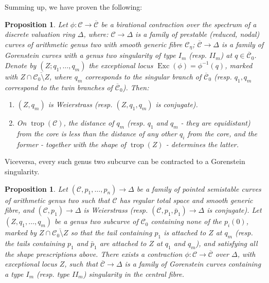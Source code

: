 \documentclass{compositio}
\renewcommand{\to}{\rightarrow}
\newcommand{\dvr}{\Delta}
\newcommand{\Exc}{\operatorname{Exc}}
\theoremstyle{plain}
\newtheorem{prop}[thm]{Proposition}
\theoremstyle{definition}
\theoremstyle{remark}
\begin{document}
 Summing up, we have proven the following:

\begin{prop}\label{prop:tailI}
 Let $\phi\colon\mathcal C\to\overline{\mathcal C}$ be a birational contraction over the spectrum of a discrete valuation ring $\dvr$, where: $\mathcal C\to \dvr$ is a family of prestable (reduced, nodal) curves of arithmetic genus two with smooth generic fibre $\mathcal C_{\eta}$; $\overline{\mathcal C}\to\dvr$ is a family of Gorenstein curves with a genus two singularity of type $I_m$ (resp. $I\!I_m$) at $q\in\overline{\mathcal C}_0$. Denote by $(Z;q_1,\ldots,q_m)$ the exceptional locus $\Exc(\phi)=\phi^{-1}(q)$, marked with $Z\cap\overline{\mathcal C_0\setminus Z}$, where $q_m$ corresponds to the singular branch of $\overline{\mathcal C}_0$ (resp. $q_1,q_m$ correspond to the twin branches of $\overline{\mathcal C}_0$). Then:
 \begin{enumerate}[leftmargin=.6cm]
  \item $(Z,q_m)$ is Weierstrass (resp. $(Z,q_1,q_m)$ is conjugate).
  \item On $\operatorname{trop}(\mathcal C)$, the distance of $q_m$ (resp. $q_1$ and $q_m$ - they are equidistant) from the core is less than the distance of any other $q_i$ from the core, and the former - together with the shape of $\operatorname{trop}(Z)$ - determines the latter.
 \end{enumerate}
\end{prop}

Viceversa, every such genus two subcurve can be contracted to a Gorenstein singularity.

\begin{prop}\label{prop:contractionI}
 Let $(\mathcal C,p_1,\ldots,p_n)\to\dvr$ be a family of pointed semistable curves of arithmetic genus two such that $\mathcal C$ has regular total space and smooth generic fibre, and $(\mathcal C,p_1)\to \Delta$ is Weierstrass (resp. $(\mathcal C,p_1,\bar p_1)\to \Delta$ is conjugate). Let $(Z,q_1,\ldots,q_m)$ be a genus two subcurve of $\mathcal C_0$ containing none of the $p_i(0)$, marked by $Z\cap \overline{\mathcal C_0\setminus Z}$ so that the tail containing $p_1$ is attached to $Z$ at $q_m$ (resp. the tails containing $p_1$ and $\bar p_1$ are attached to $Z$ at $q_1$ and $q_m$), and satisfying all the shape prescriptions above. There exists a contraction $\phi\colon\mathcal C\to\overline{\mathcal C}$ over $\dvr$, with exceptional locus $Z$, such that $\overline{\mathcal C}\to\dvr$ is a family of Gorenstein curves containing a type $I_m$ (resp. type $I\!I_m$) singularity in the central fibre.
\end{prop}
\end{document}
